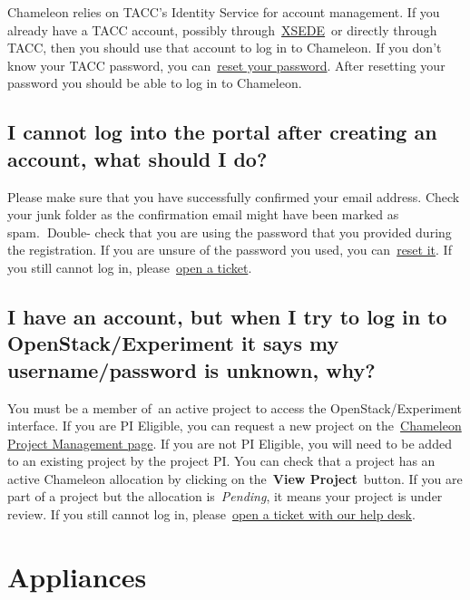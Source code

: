 Chameleon relies on TACC's Identity Service for account management. If
you already have a TACC account, possibly
through~\href{http://www.xsede.org}{XSEDE}~or directly through TACC,
then you should use that account to log in to Chameleon. If you don't
know your TACC password, you
can~\href{https://www.chameleoncloud.org/password-reset}{reset your
password}. After resetting your password you should be able to log in to
Chameleon.

\subsection{I cannot log into the portal after creating an account, what
should I
do?}\label{i-cannot-log-into-the-portal-after-creating-an-account-what-should-i-do}

Please make sure that you have successfully confirmed your email
address. Check your junk folder as the confirmation email might have
been marked as spam.\textbf{~}Double- check that you are using the
password that you provided during the registration. If you are unsure of
the password you used, you
can~\href{https://www.chameleoncloud.org/user/password-reset/}{reset
it}. If you still cannot log in,
please~\href{https://www.chameleoncloud.org/user/help/ticket/new/guest/}{open
a ticket}.

\subsection{I have an account, but when I try to log in to
OpenStack/Experiment it says my username/password is unknown,
why?}\label{i-have-an-account-but-when-i-try-to-log-in-to-openstackexperiment-it-says-my-usernamepassword-is-unknown-why}

You must be a member of~an active project to access the
OpenStack/Experiment interface. If you are PI Eligible, you can request
a new project on
the~\href{https://www.chameleoncloud.org/user/projects}{Chameleon
Project Management page}. If you are not PI Eligible, you will need to
be added to an existing project by the project PI. You can check that a
project has an active Chameleon allocation by clicking on
the~\textbf{View Project}~button. If you are part of a project but the
allocation is~\emph{Pending}, it means your project is under review. If
you still cannot log in,
please~\href{https://www.chameleoncloud.org/user/help/}{open a ticket
with our help desk}.

\section{Appliances}\label{appliances}

